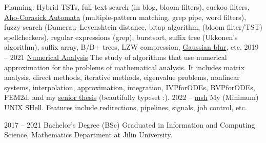 \documentclass[9pt]{developercv} %
\begin{document}
\begin{entrylist}
{		Planning: Hybrid TSTs, full-text search (in blog, bloom filters), cuckoo filters,
		\href{http://web.stanford.edu/class/archive/cs/cs166/cs166.1166/lectures/02/Small02.pdf}
		{Aho-Corasick Automata} (multiple-pattern matching, grep pipe, word filters),
		fuzzy search (Damerau–Levenshtein distance, bitap algorithm,
		(bloom filter/TST) spellcheckers),
		regular expressions (grep), burstsort,
		suffix tree (Ukkonen's algorithm), suffix array, B/B+ trees,
		LZW compression, \href{https://en.wikipedia.org/wiki/Gaussian_blur}{Gaussian blur},
		etc.}
	\entry
		{2019 -- 2021}
		{\href{https://github.com/How-u-doing/Numerical_Analysis}{Numerical Analysis}}
		{}
		{The study of algorithms that use numerical approximation for the problems of mathematical
		analysis. It includes matrix analysis, direct methods, iterative methods,
	 	eigenvalue problems, nonlinear systems, interpolation, approximation,
	 	integration, IVPforODEs, BVPforODEs, FEM2d, and my
	 	\href{https://markjohntaylor.com/FEM2d.pdf}
	 	{senior thesis} (beautifully typeset :).
 		}
	\entry
		{2022 -- }
		{\href{https://github.com/How-u-doing/msh}{msh}}
		{}
		{My (Minimum) UNIX SHell. Features include redirections, pipelines,
			  signals, job control, etc.}
\end{entrylist}



\begin{entrylist}
	\entry
		{2017 -- 2021}
		{Bachelor's Degree (BSc)}
		{}
		{Graduated in Information and Computing Science, Mathematics Department
			 at Jilin University.}
\end{entrylist}

\end{document}
